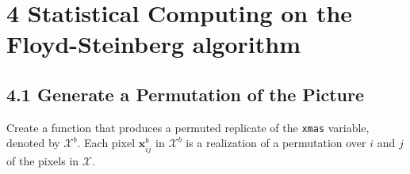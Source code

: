 \documentclass[]{article}
\newenvironment{Shaded}{\begin{snugshade}}{\end{snugshade}}
\newcommand{\DataTypeTok}[1]{\textcolor[rgb]{0.13,0.29,0.53}{#1}}
\newcommand{\DecValTok}[1]{\textcolor[rgb]{0.00,0.00,0.81}{#1}}
\newcommand{\KeywordTok}[1]{\textcolor[rgb]{0.13,0.29,0.53}{\textbf{#1}}}
\newcommand{\NormalTok}[1]{#1}
\newcommand{\OperatorTok}[1]{\textcolor[rgb]{0.81,0.36,0.00}{\textbf{#1}}}
\newcommand{\StringTok}[1]{\textcolor[rgb]{0.31,0.60,0.02}{#1}}
\begin{document}
\begin{Shaded}
\end{Shaded}

\clearpage

\hypertarget{statistical-computing-on-the-floyd-steinberg-algorithm}{%
\section{4 Statistical Computing on the Floyd-Steinberg
algorithm}\label{statistical-computing-on-the-floyd-steinberg-algorithm}}

\hypertarget{generate-a-permutation-of-the-picture}{%
\subsection{4.1 Generate a Permutation of the
Picture}\label{generate-a-permutation-of-the-picture}}

Create a function that produces a permuted replicate of the
\texttt{xmas} variable, denoted by \(\mathcal{X}^b\). Each pixel
\(\mathbf{x}^b_{ij}\) in \(\mathcal{X}^b\) is a realization of a
permutation over \(i\) and \(j\) of the pixels in \(\mathcal{X}\).
\end{document}
